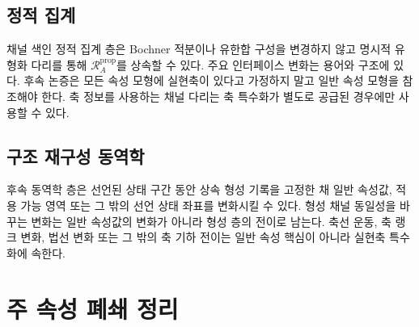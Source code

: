 \documentclass[11pt]{article}
\newcommand{\PropRec}{\mathcal R^{\mathrm{prop}}}
\theoremstyle{definition}
\theoremstyle{remark}
\begin{document}
\subsection{정적 집계}

채널 색인 정적 집계 층은 Bochner 적분이나 유한합 구성을 변경하지 않고 명시적 유형화 다리를 통해 \(\PropRec_A\)를 상속할 수 있다.
주요 인터페이스 변화는 용어와 구조에 있다. 후속 논증은 모든 속성 모형에 실현축이 있다고 가정하지 말고 일반 속성 모형을 참조해야 한다.
축 정보를 사용하는 채널 다리는 축 특수화가 별도로 공급된 경우에만 사용할 수 있다.

\subsection{구조 재구성 동역학}

후속 동역학 층은 선언된 상태 구간 동안 상속 형성 기록을 고정한 채 일반 속성값, 적용 가능 영역 또는 그 밖의 선언 상태 좌표를 변화시킬 수 있다.
형성 채널 동일성을 바꾸는 변화는 일반 속성값의 변화가 아니라 형성 층의 전이로 남는다.
축선 운동, 축 랭크 변화, 법선 변화 또는 그 밖의 축 기하 전이는 일반 속성 핵심이 아니라 실현축 특수화에 속한다.

\section{주 속성 폐쇄 정리}
\label{sec:main-theorem}
\end{document}
